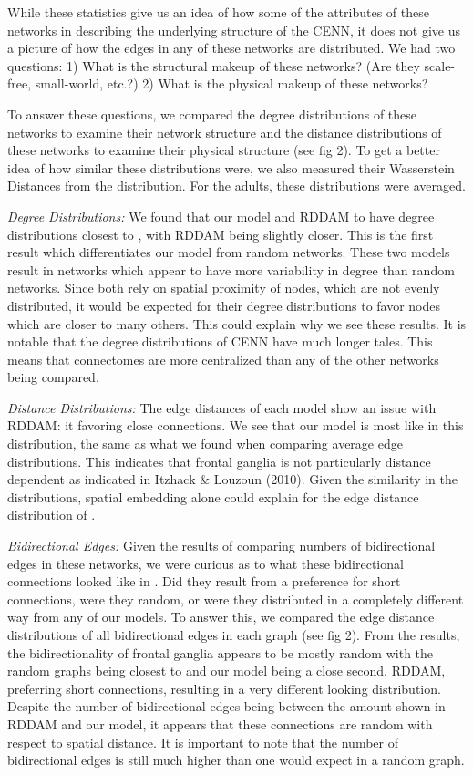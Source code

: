 While these statistics give us an idea of how some of the attributes of these networks in describing the underlying structure of the CENN, it does not give us a picture of how the edges in any of these networks are distributed. We had two questions: 1) What is the structural makeup of these networks? (Are they scale-free, small-world, etc.?) 2) What is the physical makeup of these networks?

To answer these questions, we compared the degree distributions of these networks to examine their network structure and the distance distributions of these networks to examine their physical structure (see fig 2). To get a better idea of how similar these distributions were, we also measured their Wasserstein Distances from the \ce distribution. For the adults, these distributions were averaged.

\textit{Degree Distributions:} We found that our model and RDDAM to have degree distributions closest to \ce, with RDDAM being slightly closer. This is the first result which differentiates our model from random networks. These two models result in networks which appear to have more variability in degree than random networks. Since both rely on spatial proximity of nodes, which are not evenly distributed, it would be expected for their degree distributions to favor nodes which are closer to many others. This could explain why we see these results. It is notable that the degree distributions of CENN have much longer tales. This means that \ce connectomes are more centralized than any of the other networks being compared.

\textit{Distance Distributions:} The edge distances of each model show an issue with RDDAM: it favoring close connections. We see that our model is most like \ce in this distribution, the same as what we found when comparing average edge distributions. This indicates that \ce frontal ganglia is not particularly distance dependent as indicated in Itzhack \& Louzoun (2010). Given the similarity in the distributions, spatial embedding alone could explain for the edge distance distribution of \ce. 

\textit{Bidirectional Edges:} Given the results of comparing numbers of bidirectional edges in these networks, we were curious as to what these bidirectional connections looked like in \ce. Did they result from a preference for short connections, were they random, or were they distributed in a completely different way from any of our models. To answer this, we compared the edge distance distributions of all bidirectional edges in each graph (see fig 2). From the results, the bidirectionality of \ce frontal ganglia appears to be mostly random with the random graphs being closest to \ce and our model being a close second. RDDAM, preferring short connections, resulting in a very different looking distribution. Despite the number of bidirectional edges being between the amount shown in RDDAM and our model, it appears that these connections are random with respect to spatial distance. It is important to note that the number of bidirectional edges is still much higher than one would expect in a random graph. 

